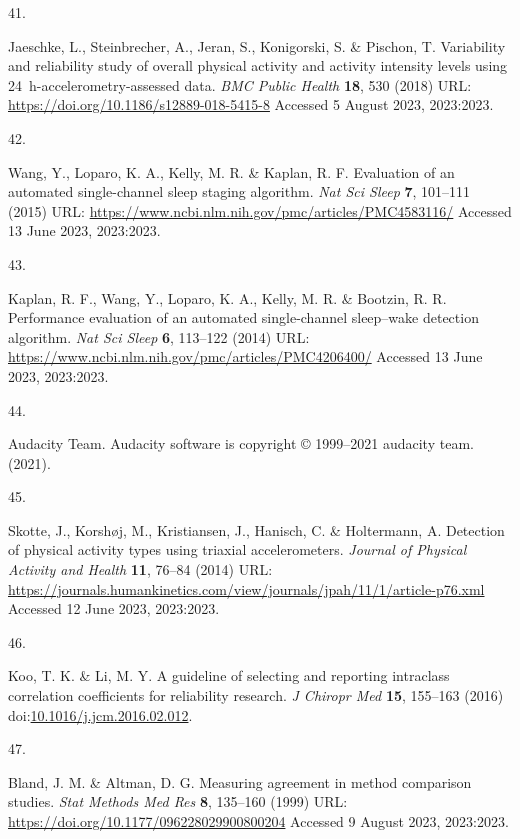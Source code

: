 \documentclass[
  9pt,
]{article}
\newlength{\cslhangindent}
\newlength{\csllabelwidth}
\newlength{\cslentryspacingunit} %
\newenvironment{CSLReferences}[2] %
 {%
  \setlength{\parindent}{0pt}
  \ifodd #1
  \let\oldpar\par
  \def\par{\hangindent=\cslhangindent\oldpar}
  \fi
  \setlength{\parskip}{#2\cslentryspacingunit}
 }%
 {}
\newcommand{\CSLLeftMargin}[1]{\parbox[t]{\csllabelwidth}{#1}}
\newcommand{\CSLRightInline}[1]{\parbox[t]{\linewidth - \csllabelwidth}{#1}\break}
\begin{document}
\begin{CSLReferences}{0}{0}
\leavevmode{}%
\CSLLeftMargin{41. }%
\CSLRightInline{Jaeschke, L., Steinbrecher, A., Jeran, S., Konigorski,
S. \& Pischon, T. Variability and reliability study of overall physical
activity and activity intensity levels using 24~h-accelerometry-assessed
data. \emph{{BMC} Public Health} \textbf{18}, 530 (2018) URL:
\url{https://doi.org/10.1186/s12889-018-5415-8} Accessed 5 August 2023,
2023:2023.}

\leavevmode{}%
\CSLLeftMargin{42. }%
\CSLRightInline{Wang, Y., Loparo, K. A., Kelly, M. R. \& Kaplan, R. F.
Evaluation of an automated single-channel sleep staging algorithm.
\emph{Nat Sci Sleep} \textbf{7}, 101--111 (2015) URL:
\url{https://www.ncbi.nlm.nih.gov/pmc/articles/PMC4583116/} Accessed 13
June 2023, 2023:2023.}

\leavevmode{}%
\CSLLeftMargin{43. }%
\CSLRightInline{Kaplan, R. F., Wang, Y., Loparo, K. A., Kelly, M. R. \&
Bootzin, R. R. Performance evaluation of an automated single-channel
sleep--wake detection algorithm. \emph{Nat Sci Sleep} \textbf{6},
113--122 (2014) URL:
\url{https://www.ncbi.nlm.nih.gov/pmc/articles/PMC4206400/} Accessed 13
June 2023, 2023:2023.}

\leavevmode{}%
\CSLLeftMargin{44. }%
\CSLRightInline{Audacity Team. Audacity\textregistered{} software is
copyright © 1999--2021 audacity team. (2021).}

\leavevmode{}%
\CSLLeftMargin{45. }%
\CSLRightInline{Skotte, J., Korshøj, M., Kristiansen, J., Hanisch, C. \&
Holtermann, A. Detection of physical activity types using triaxial
accelerometers. \emph{Journal of Physical Activity and Health}
\textbf{11}, 76--84 (2014) URL:
\url{https://journals.humankinetics.com/view/journals/jpah/11/1/article-p76.xml}
Accessed 12 June 2023, 2023:2023.}

\leavevmode{}%
\CSLLeftMargin{46. }%
\CSLRightInline{Koo, T. K. \& Li, M. Y. A guideline of selecting and
reporting intraclass correlation coefficients for reliability research.
\emph{J Chiropr Med} \textbf{15}, 155--163 (2016)
doi:\href{https://doi.org/10.1016/j.jcm.2016.02.012}{10.1016/j.jcm.2016.02.012}.}

\leavevmode{}%
\CSLLeftMargin{47. }%
\CSLRightInline{Bland, J. M. \& Altman, D. G. Measuring agreement in
method comparison studies. \emph{Stat Methods Med Res} \textbf{8},
135--160 (1999) URL: \url{https://doi.org/10.1177/096228029900800204}
Accessed 9 August 2023, 2023:2023.}

\end{CSLReferences}
\end{document}
